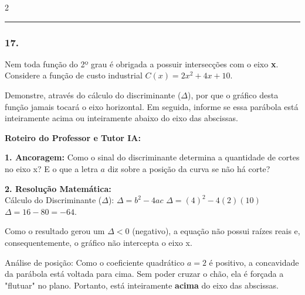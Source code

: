 \begin{multicols*}{2}
\par\vspace{\espacoQuestao}

\noindent\textcolor{CorLinha}{\rule{\linewidth}{0.5pt}} 
\par\vspace{\espacoPreQuestao}
\subsubsection*{17.} 
\begin{enunciadoLiteral}
Nem toda função do 2º grau é obrigada a possuir intersecções com o eixo \textbf{x}. Considere a função de custo industrial $C(x) = 2x^2 + 4x + 10$.

Demonstre, através do cálculo do discriminante ($\Delta$), por que o gráfico desta função jamais tocará o eixo horizontal. Em seguida, informe se essa parábola está inteiramente acima ou inteiramente abaixo do eixo das abscissas.
\end{enunciadoLiteral}

\ifgabarito
    \begin{tcolorbox}[colback=CorTitUm!5, colframe=CorTitUm, boxrule=1pt, arc=4pt, left=6pt, right=6pt, top=6pt, bottom=6pt]
    \small\textbf{\textcolor{CorTitUm}{Roteiro do Professor e Tutor IA:}}\par\vspace{0.1cm}
    \color{CinzaEscuro}
    \textbf{1. Ancoragem:} Como o sinal do discriminante determina a quantidade de cortes no eixo x? E o que a letra $a$ diz sobre a posição da curva se não há corte?\par\vspace{0.1cm}
    \textbf{2. Resolução Matemática:}\\
    Cálculo do Discriminante ($\Delta$):
    $\Delta = b^2 - 4ac$
    $\Delta = (4)^2 - 4(2)(10)$
    $\Delta = 16 - 80 = -64$.
    
    Como o resultado gerou um $\Delta < 0$ (negativo), a equação não possui raízes reais e, consequentemente, o gráfico não intercepta o eixo x. 
    
    Análise de posição: Como o coeficiente quadrático $a = 2$ é positivo, a concavidade da parábola está voltada para cima. Sem poder cruzar o chão, ela é forçada a "flutuar" no plano. Portanto, está inteiramente \textbf{acima} do eixo das abscissas.
    \end{tcolorbox}
    \vspace{0.15cm}
    

\end{multicols*}
